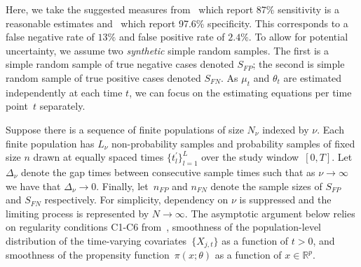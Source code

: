 \documentclass[11pt]{amsart}
\numberwithin{equation}{section}
\theoremstyle{plain}
\begin{document}

Here, we take the suggested measures from~\cite{Arevalo2020} which report 87\% sensitivity is a reasonable estimates and~\cite{Cohen2020} which report 97.6\% specificity.  This corresponds to a false negative rate of $13\%$ and false positive rate of $2.4\%$.  To allow for potential uncertainty, we assume two \emph{synthetic} simple random samples.  The first is a simple random sample of true negative cases denoted $S_{FP}$; the second is simple random sample of true positive cases denoted $S_{FN}$.  As $\mu_t$ and $\theta_{t}$ are estimated independently at each time $t$, we can focus on the estimating equations per time point~$t$ separately.

Suppose there is a sequence of finite populations of size $N_{\nu}$ indexed by $\nu$.  Each finite population has $L_\nu$ non-probability samples and  probability samples of fixed size $n$ drawn at equally spaced times $\{ t^\prime_l \}_{l=1}^L$ over the study window~$[0,T]$. Let~$\Delta_\nu$ denote the gap times between consecutive sample times such that as $\nu \to \infty$ we have that $\Delta_\nu \to 0$. Finally, let~$n_{FP}$ and $n_{FN}$ denote the sample sizes of $S_{FP}$ and $S_{FN}$ respectively.  For simplicity, dependency on $\nu$ is suppressed and the limiting process is represented by $N \to \infty$. The asymptotic argument below relies on regularity conditions C1-C6 from~\cite{Chen2019}, smoothness of the population-level distribution of the time-varying covariates~$\{ X_{j,t} \}$ as a function of $t > 0$, and smoothness of the propensity function~$\pi(x; \theta)$ as a function of $x \in \mathbb{R}^p$.
\end{document}
